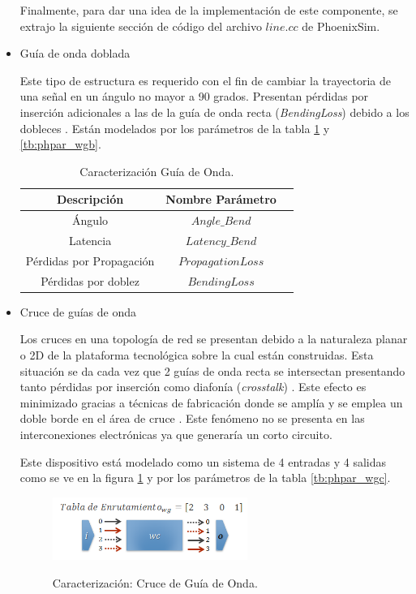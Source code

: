 \begin{itemize}
Finalmente, para dar una idea de la implementación de este componente, se extrajo la siguiente
sección de código del archivo $line.cc$ de PhoenixSim.



\item Guía de onda doblada

Este tipo de estructura es requerido con el fin de cambiar la trayectoria de una señal en
un ángulo no mayor a 90 grados. Presentan pérdidas por inserción adicionales a las de 
la guía de onda recta (\textit{BendingLoss}) debido a 
los dobleces \cite{Chan2011}. Están modelados por los parámetros de la tabla \ref{tb:wgb_params} 
y \ref{tb:phpar_wgb}.

\begin{table}[H]
\centering
\begin{tabular}{|c|c|c|}
\hline
Descripción &  Nombre Parámetro \\
\hline
Ángulo & $Angle\_Bend$ \\
Latencia & $Latency\_Bend$ \\
Pérdidas por Propagación & $PropagationLoss$ \\
Pérdidas por doblez & $BendingLoss$ \\
\hline
\end{tabular}
\caption{Caracterización Guía de Onda.}
\label{tb:wgb_params}
\end{table} 


\item Cruce de guías de onda

Los cruces en una topología de red se presentan debido a la naturaleza planar o 2D 
de la plataforma tecnológica sobre la cual están construidas. Esta situación se da cada vez que 
2 guías de onda recta se intersectan presentando tanto pérdidas por inserción como diafonía 
(\textit{crosstalk}) \cite{Chan2010}. Este efecto es minimizado gracias a técnicas de fabricación donde 
se amplía y se emplea un doble borde en el área de cruce \cite{bogaerts2007low}.
Este fenómeno no se presenta en las interconexiones electrónicas ya que generaría un corto
circuito. 

Este dispositivo está modelado como un sistema de 4 entradas y 4 salidas como se ve en la 
figura \ref{fig:phoenix_wgc} y por los parámetros de la tabla \ref{tb:phpar_wgc}.
\begin{figure}[H]
\caption{Caracterización: Cruce de Guía de Onda.}
\centering
\includegraphics[width=0.6\textwidth,natwidth=430,natheight=139]{figs/wgcross.png}
\label{fig:phoenix_wgc}
\end{figure}


\end{itemize}
